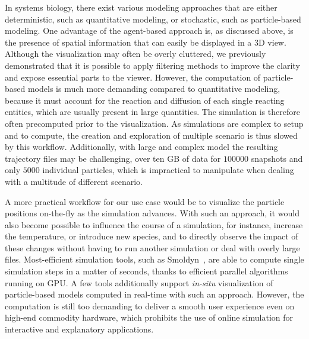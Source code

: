 In systems biology, there exist various modeling approaches that are either deterministic, such as quantitative modeling, or stochastic, such as particle-based modeling.
One advantage of the agent-based approach is, as discussed above, is the presence of spatial information that can easily be displayed in a 3D view.
Although the visualization may often be overly cluttered, we previously demonstrated that it is possible to apply filtering methods to improve the clarity and expose essential parts to the viewer.
However, the computation of particle-based models is much more demanding compared to quantitative modeling, because it must account for the reaction and diffusion of each single reacting entities, which are usually present in large quantities.
The simulation is therefore often precomputed prior to the visualization.
As simulations are complex to setup and to compute, the creation and exploration of multiple scenario is thus slowed by this workflow.
Additionally, with large and complex model the resulting trajectory files may be challenging, over ten GB of data for $100000$ snapshots and only $5000$ individual particles, which is impractical to manipulate when dealing with a multitude of different scenario.

A more practical workflow for our use case would be to visualize the particle positions on-the-fly as the simulation advances.
With such an approach, it would also become possible to influence the course of a simulation, for instance, increase the temperature, or introduce new species, and to directly observe the impact of these changes without having to run another simulation or deal with overly large files.
Most-efficient simulation tools, such as Smoldyn~\cite{andrews2010detailed}, are able to compute single simulation steps in a matter of seconds, thanks to efficient parallel algorithms running on GPU.
A few tools additionally support \textit{in-situ} visualization of particle-based models computed in real-time with such an approach.
However, the computation is still too demanding to deliver a smooth user experience even on high-end commodity hardware, which prohibits the use of online simulation for interactive and explanatory applications.

